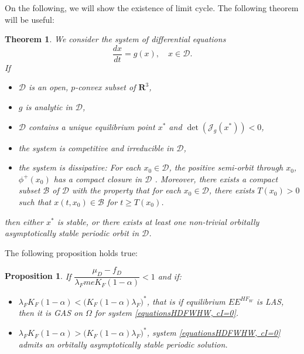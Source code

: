\documentclass{article}
\newcommand{\lfw}{\lambda_{F}}
\newcommand{\lfw}{\lambda_{F}}
\newtheorem{theorem}{Theorem}
\newtheorem{prop}{Proposition}
\begin{document}
On the following, we will show the existence of limit cycle. The following theorem will be useful:

\begin{theorem}\cite{zhu_stable_1994}\label{periodicASOrbit}
We consider the system of differential equations
$$
\dfrac{dx}{dt} = g(x), \quad x \in \mathcal{D}.
$$
If
\begin{itemize}
\item $\mathcal{D}$ is an open, $p$-convex subset of $\mathbf{R}^3$,
\item $g$ is analytic in $\mathcal{D}$,
\item $\mathcal{D}$ contains a unique equilibrium point $x^*$ and $\det(\mathcal{J}_g(x^*)) < 0$,
\item the system is competitive and irreducible in $\mathcal{D}$,
\item the system is dissipative: For each $x_0 \in \mathcal{D}$, the positive semi-orbit through $x_0$, $\phi^+(x_0)$ has a compact closure in $\mathcal{D}$ . Moreover, there exists a compact subset $\mathcal{B}$ of $\mathcal{D}$ with the property that for each $x_0 \in \mathcal{D}$, there exists $T(x_0) > 0$ such that $x(t, x_0) \in \mathcal{B}$ for $t \geq T(x_0)$.
\end{itemize}

then either $x^*$ is stable, or there exists at least one non-trivial orbitally asymptotically stable  periodic orbit in $\mathcal{D}$.
\end{theorem}

The following proposition holds true:

\begin{prop}\label{LimitCycle, cI=0}
If $\dfrac{\mu_D - f_D}{\lfw m e K_F(1-\alpha)} < 1$ and if:
\begin{itemize}
\item $\lfw K_F(1-\alpha) < \Big(K_F(1-\alpha) \lfw \Big)^*$, that is if equilibrium $EE^{HF_W}$ is LAS, then it is GAS on $\Omega$ for system \eqref{equationsHDFWHW, cI=0}.
\item $\lfw K_F(1-\alpha) > \Big(K_F(1-\alpha) \lfw \Big)^*$, system \eqref{equationsHDFWHW, cI=0} admits an orbitally asymptotically stable periodic solution.
\end{itemize}
\end{prop}
\end{document}
